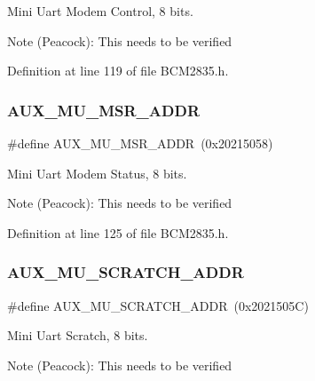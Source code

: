 Mini Uart Modem Control, 8 bits. 

\begin{DoxyNote}{Note}
(Peacock)\+: This needs to be verified 
\end{DoxyNote}


Definition at line 119 of file B\+C\+M2835.\+h.

\mbox{\label{group__UART_gad7e37af940a9ff96e6aba9d307b926be}} 
\subsubsection{\texorpdfstring{A\+U\+X\+\_\+\+M\+U\+\_\+\+M\+S\+R\+\_\+\+A\+D\+DR}{AUX\_MU\_MSR\_ADDR}}
{\footnotesize\ttfamily \#define A\+U\+X\+\_\+\+M\+U\+\_\+\+M\+S\+R\+\_\+\+A\+D\+DR~(0x20215058)}



Mini Uart Modem Status, 8 bits. 

\begin{DoxyNote}{Note}
(Peacock)\+: This needs to be verified 
\end{DoxyNote}


Definition at line 125 of file B\+C\+M2835.\+h.

\mbox{\label{group__UART_ga34eb1e827236c566957962b30be74496}} 
\subsubsection{\texorpdfstring{A\+U\+X\+\_\+\+M\+U\+\_\+\+S\+C\+R\+A\+T\+C\+H\+\_\+\+A\+D\+DR}{AUX\_MU\_SCRATCH\_ADDR}}
{\footnotesize\ttfamily \#define A\+U\+X\+\_\+\+M\+U\+\_\+\+S\+C\+R\+A\+T\+C\+H\+\_\+\+A\+D\+DR~(0x2021505\+C)}



Mini Uart Scratch, 8 bits. 

\begin{DoxyNote}{Note}
(Peacock)\+: This needs to be verified 
\end{DoxyNote}


